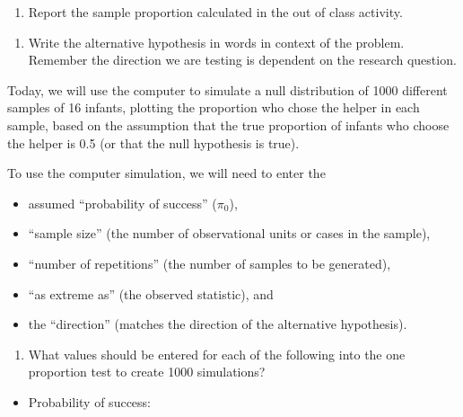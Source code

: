 \documentclass[
]{report}
\providecommand{\tightlist}{%
  \setlength{\itemsep}{0pt}\setlength{\parskip}{0pt}}
\begin{document}
\begin{enumerate}
\def\labelenumi{\arabic{enumi}.}
\tightlist
\item
  Report the sample proportion calculated in the out of class activity.
\end{enumerate}

\newpage

\begin{enumerate}
\def\labelenumi{\arabic{enumi}.}
\setcounter{enumi}{1}
\tightlist
\item
  Write the alternative hypothesis in words in context of the problem. Remember the direction we are testing is dependent on the research question.
\end{enumerate}

\vspace{0.8in}

Today, we will use the computer to simulate a null distribution of 1000 different samples of 16 infants, plotting the proportion who chose the helper in each sample, based on the assumption that the true proportion of infants who choose the helper is 0.5 (or that the null hypothesis is true).

To use the computer simulation, we will need to enter the

\begin{itemize}
\tightlist
\item
  assumed ``probability of success'' (\(\pi_0\)),
\item
  ``sample size'' (the number of observational units or cases in the sample),
\item
  ``number of repetitions'' (the number of samples to be generated),
\item
  ``as extreme as'' (the observed statistic), and
\item
  the ``direction'' (matches the direction of the alternative hypothesis).
\end{itemize}

\begin{enumerate}
\def\labelenumi{\arabic{enumi}.}
\setcounter{enumi}{2}
\tightlist
\item
  What values should be entered for each of the following into the one proportion test to create 1000 simulations?
\end{enumerate}

\vspace{1mm}

\begin{itemize}
\tightlist
\item
  Probability of success:
\end{itemize}
\end{document}
